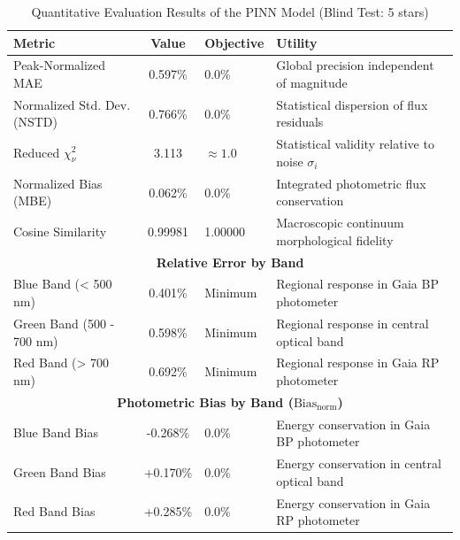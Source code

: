 
\begin{table}[htpb]
\centering
\caption{Quantitative Evaluation Results of the PINN Model (Blind Test: 5 stars)}
\label{tab:pinn_evaluation}
\begin{tabular}{lcll}
\hline
\textbf{Metric} & \textbf{Value} & \textbf{Objective} & \textbf{Utility} \\
\hline
Peak-Normalized MAE & 0.597\% & 0.0\% & Global precision independent of magnitude \\
Normalized Std. Dev. (NSTD) & 0.766\% & 0.0\% & Statistical dispersion of flux residuals \\
Reduced $\chi^2_\nu$ & 3.113 & $\approx 1.0$ & Statistical validity relative to noise $\sigma_i$ \\
Normalized Bias (MBE) & 0.062\% & 0.0\% & Integrated photometric flux conservation \\
Cosine Similarity & 0.99981 & 1.00000 & Macroscopic continuum morphological fidelity \\
\hline
\multicolumn{4}{c}{\textbf{Relative Error by Band}} \\
\hline
Blue Band (< 500 nm) & 0.401\% & Minimum & Regional response in Gaia BP photometer \\
Green Band (500 - 700 nm) & 0.598\% & Minimum & Regional response in central optical band \\
Red Band (> 700 nm) & 0.692\% & Minimum & Regional response in Gaia RP photometer \\
\hline
\multicolumn{4}{c}{\textbf{Photometric Bias by Band ($\text{Bias}_{\text{norm}}$)}} \\
\hline
Blue Band Bias & -0.268\% & 0.0\% & Energy conservation in Gaia BP photometer \\
Green Band Bias & +0.170\% & 0.0\% & Energy conservation in central optical band \\
Red Band Bias & +0.285\% & 0.0\% & Energy conservation in Gaia RP photometer \\
\hline
\end{tabular}
\end{table}
